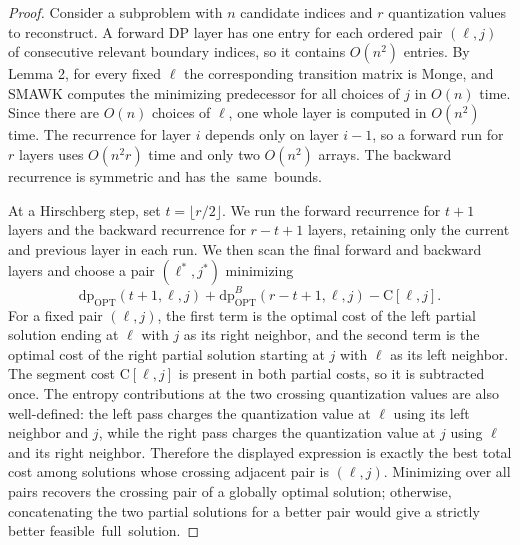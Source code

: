 \documentclass[11pt,letterpaper]{article}
\begin{document}
{\newcommand{\dopt}{\mathrm{dp}_{\mathrm{OPT}}}
\newcommand{\doptB}{\mathrm{dp}^{B}_{\mathrm{OPT}}}
\newcommand{\Cost}{\mathrm{C}}

\begin{proof}

Consider a subproblem with $n$ candidate indices and $r$ quantization values to reconstruct. A forward DP layer has one entry for each ordered pair $(\ell,j)$ of consecutive relevant boundary indices, so it contains $O(n^2)$ entries. By Lemma 2, for every fixed $\ell$ the corresponding transition matrix is Monge, and SMAWK computes the minimizing predecessor for all choices of $j$ in $O(n)$ time. Since there are $O(n)$ choices of $\ell$, one whole layer is computed in $O(n^2)$ time. The recurrence for layer $i$ depends only on layer $i-1$, so a forward run for $r$ layers uses $O(n^2 r)$ time and only two $O(n^2)$ arrays. The backward recurrence is symmetric and has \mbox{the same bounds.}

At a Hirschberg step, set $t=\lfloor r/2\rfloor$. We run the forward recurrence for $t+1$ layers and the backward recurrence for $r-t+1$ layers, retaining only the current and previous layer in each run. We then scan the final forward and backward layers and choose a pair $(\ell^*,j^*)$ minimizing
\[
  \dopt(t+1,\ell,j)
  + \doptB(r-t+1,\ell,j)
  - \Cost[\ell,j].
\]
For a fixed pair $(\ell,j)$, the first term is the optimal cost of the left partial solution ending at $\ell$ with $j$ as its right neighbor, and the second term is the optimal cost of the right partial solution starting at $j$ with $\ell$ as its left neighbor. The segment cost $\Cost[\ell,j]$ is present in both partial costs, so it is subtracted once. The entropy contributions at the two crossing quantization values are also well-defined: the left pass charges the quantization value at $\ell$ using its left neighbor and $j$, while the right pass charges the quantization value at $j$ using $\ell$ and its right neighbor. Therefore the displayed expression is exactly the best total cost among solutions whose crossing adjacent pair is $(\ell,j)$. Minimizing over all pairs recovers the crossing pair of a globally optimal solution; otherwise, concatenating the two partial solutions for a better pair would give a strictly better \mbox{feasible full solution.}


\end{proof}}
\end{document}
